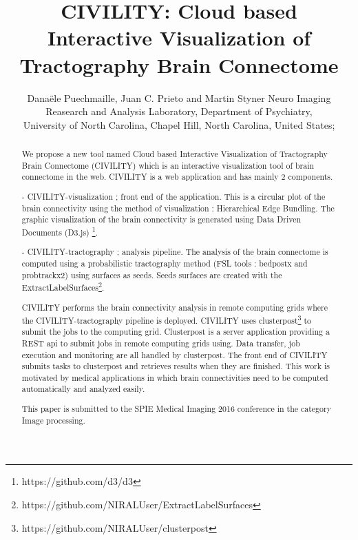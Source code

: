 \documentclass[]{spie}  %
\title{CIVILITY: Cloud based Interactive Visualization of Tractography Brain Connectome}
\author{Dana\"{e}le Puechmaille\supit{a}, Juan C. Prieto\supit{a} and Martin Styner\supit{a}
\skiplinehalf
\supit{a}Neuro Imaging Reasearch and Analysis Laboratory, Department of Psychiatry, \\
 University of North Carolina, Chapel Hill, North Carolina, United States;
}
\begin{document}
 
  \maketitle 

\begin{abstract}

We propose a new tool named Cloud based Interactive Visualization of Tractography Brain Connectome (CIVILITY) which is an interactive visualization tool of brain connectome in the web.
CIVILITY is a web application and has mainly 2 components.

- CIVILITY-visualization ; front end of the application. This is a circular plot of the brain connectivity using the method of visualization : Hierarchical Edge Bundling. The graphic visualization of the brain connectivity is generated using Data Driven Documents (D3.js) \footnote{https://github.com/d3/d3}.

- CIVILITY-tractography ; analysis pipeline. The analysis of the brain connectome is computed using a probabilistic tractography method (FSL tools : bedpostx and probtrackx2) using surfaces as seeds. Seeds surfaces are created with the ExtractLabelSurfaces\footnote{https://github.com/NIRALUser/ExtractLabelSurfaces}.

CIVILITY performs the brain connectivity analysis in remote computing grids where the CIVILITY-tractography pipeline is deployed. CIVILITY uses clusterpost\footnote{https://github.com/NIRALUser/clusterpost} to submit the jobs to the computing grid. Clusterpost is a server application providing a REST api to submit jobs in remote computing grids using. Data transfer, job execution and monitoring are all handled by clusterpost.
The front end of CIVILITY submits tasks to clusterpost and retrieves results when they are finished.
This work is motivated by medical applications in which brain connectivities need to be computed automatically and analyzed easily.

This paper is submitted to the SPIE Medical Imaging 2016 conference in the category Image processing. 

\end{abstract}



\end{document}
